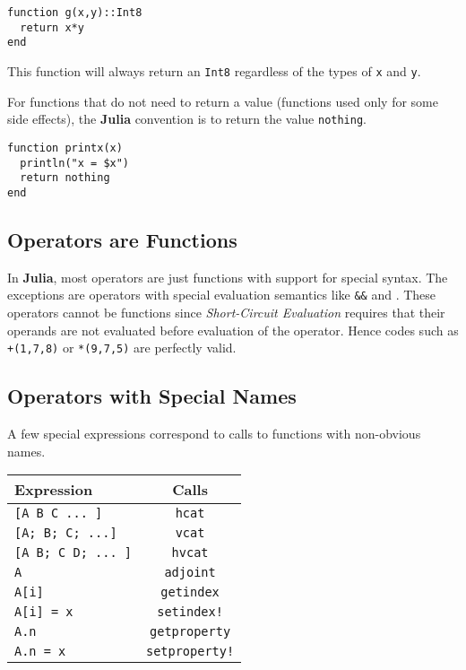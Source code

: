 \documentclass[
]{article}
\begin{document}
\begin{verbatim}
function g(x,y)::Int8
  return x*y
end
\end{verbatim}

This function will always return an \texttt{Int8} regardless of the
types of \texttt{x} and \texttt{y}.

For functions that do not need to return a value (functions used only
for some side effects), the \textbf{Julia} convention is to return the
value \texttt{nothing}.

\begin{verbatim}
function printx(x)
  println("x = $x")
  return nothing
end
\end{verbatim}

\hypertarget{operators-are-functions}{%
\subsection{Operators are Functions}\label{operators-are-functions}}

In \textbf{Julia}, most operators are just functions with support for
special syntax. The exceptions are operators with special evaluation
semantics like \texttt{\&\&} and \texttt{\textbar{}\textbar{}}. These
operators cannot be functions since \emph{Short-Circuit Evaluation}
requires that their operands are not evaluated before evaluation of the
operator. Hence codes such as \texttt{+(1,7,8)} or \texttt{*(9,7,5)} are
perfectly valid.

\hypertarget{operators-with-special-names}{%
\subsection{Operators with Special
Names}\label{operators-with-special-names}}

A few special expressions correspond to calls to functions with
non-obvious names.

\begin{longtable}[]{@{}lc@{}}
\toprule\noalign{}
Expression & Calls \\
\midrule\noalign{}
\endhead
\bottomrule\noalign{}
\endlastfoot
\texttt{{[}A\ B\ C\ ...\ {]}} & \texttt{hcat} \\
\texttt{{[}A;\ B;\ C;\ ...{]}} & \texttt{vcat} \\
\texttt{{[}A\ B;\ C\ D;\ ...\ {]}} & \texttt{hvcat} \\
\texttt{A\textquotesingle{}} & \texttt{adjoint} \\
\texttt{A{[}i{]}} & \texttt{getindex} \\
\texttt{A{[}i{]}\ =\ x} & \texttt{setindex!} \\
\texttt{A.n} & \texttt{getproperty} \\
\texttt{A.n\ =\ x} & \texttt{setproperty!} \\
\end{longtable}
\end{document}
